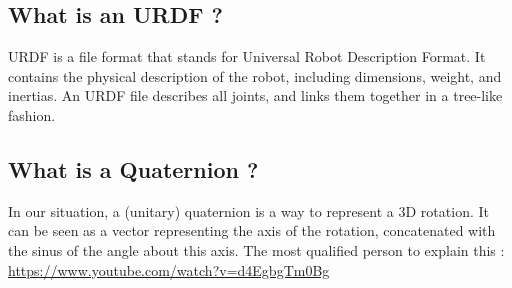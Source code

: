 \documentclass[a4paper,10pt]{article}
\begin{document}
\subsection{What is an URDF ?}
URDF is a file format that stands for Universal Robot Description Format. It contains the physical description of the robot, including dimensions, weight, and inertias. An URDF file describes all joints, and links them together in a tree-like fashion.


\subsection{What is a Quaternion ?}
In our situation, a (unitary) quaternion is a way to represent a 3D rotation. It can be seen as a vector representing the axis of the rotation, concatenated with the sinus of the angle about this axis.
The most qualified person to explain this :\\
\url{https://www.youtube.com/watch?v=d4EgbgTm0Bg}
\end{document}
